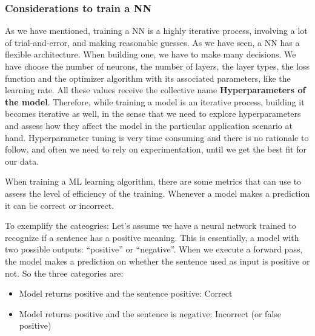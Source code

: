 \documentclass[a4paper, 11pt]{report}
\begin{document}
\subsubsection{Considerations to train a NN}\label{Theory: NN-considerations}
As we have mentioned, training a NN is a highly iterative process, involving a lot of trial-and-error, and making reasonable guesses. As we have seen, a NN has a flexible architecture. When building one, we have to make many decisions. We have choose the number of neurons, the number of layers, the layer types, the loss function and the optimizer algorithm with its associated parameters, like the learning rate. All these values receive the collective name \textbf{Hyperparameters of the model}.
Therefore, while training a model is an iterative process, building it becomes iterative as well, in the sense that we need to explore hyperparameters and assess how they affect the model in the particular application scenario at hand. Hyperparameter tuning is very time consuming and there is no rationale to follow, and often we need to rely on experimentation, until we get the best fit for our data.

When training a ML learning algorithm, there are some metrics that can use to assess the level of efficiency of the training. Whenever a model makes a prediction it can be correct or incorrect.

To exemplify the cateogries: Let's assume we have a neural network trained to recognize if a sentence has a positive meaning. This is essentially, a model with two possible outputs: ``positive'' or ``negative''. When we execute a forward pass, the model makes a prediction on whether the sentence used as input is positive or not. So the three categories are:
\begin{itemize}
    \item Model returns positive and the sentence positive: Correct
    \item Model returns positive and the sentence is negative: Incorrect (or false positive)
\end{itemize}
\end{document}
